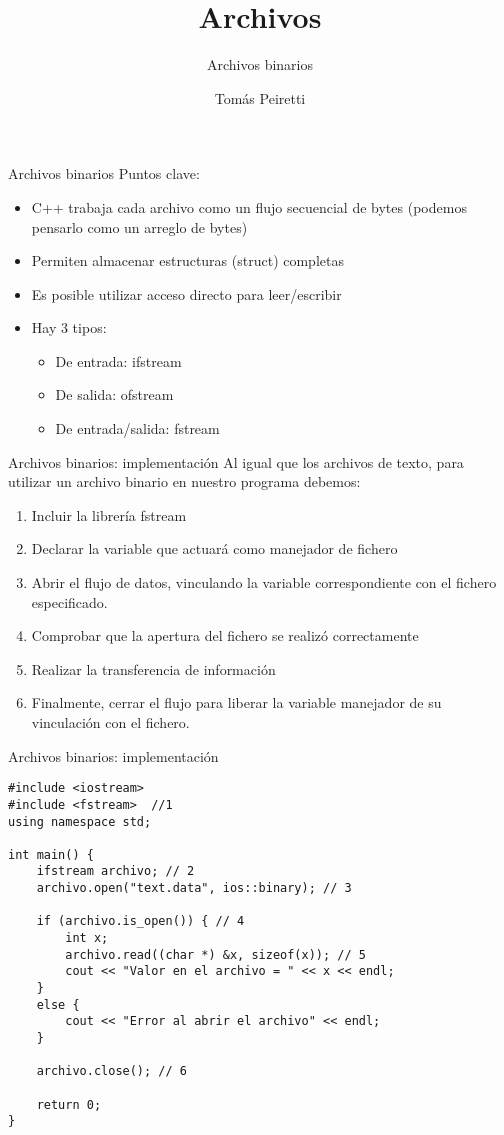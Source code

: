 \documentclass[12pt]{beamer}
\title{Archivos}
\subtitle{Archivos binarios}
\author{Tomás Peiretti}
\date{}
\begin{document}
\maketitle

\begin{frame}{Archivos binarios}
    Puntos clave:
    \begin{itemize}
        \item C++ trabaja cada archivo como un \alert{flujo secuencial de bytes} (podemos pensarlo como un arreglo de bytes)
        \item Permiten almacenar estructuras (struct) completas
        \item Es posible utilizar acceso directo para leer/escribir
        \item Hay 3 tipos:
        \begin{itemize}
            \item De entrada: \alert{ifstream}
            \item De salida: \alert{ofstream}
            \item De entrada/salida: \alert{fstream}
        \end{itemize}
    \end{itemize}
\end{frame}

\begin{frame}{Archivos binarios: implementación}
    Al igual que los archivos de texto, para utilizar un archivo binario en nuestro programa debemos:
        \begin{enumerate}
            \item Incluir la librería fstream
            \item Declarar la variable que actuará como manejador de fichero
            \item Abrir el flujo de datos, vinculando la variable correspondiente con el fichero especificado.
            \item Comprobar que la apertura del fichero se realizó correctamente
            \item \alert{Realizar la transferencia de información}
            \item Finalmente, cerrar el flujo para liberar la variable manejador de su vinculación con el fichero.
        \end{enumerate}
\end{frame}

\begin{frame}[fragile]{Archivos binarios: implementación}
\begin{lstlisting}[basicstyle=\scriptsize]
#include <iostream>
#include <fstream>  //1
using namespace std;

int main() {
	ifstream archivo; // 2
	archivo.open("text.data", ios::binary); // 3
	
	if (archivo.is_open()) { // 4
		int x;
		archivo.read((char *) &x, sizeof(x)); // 5
		cout << "Valor en el archivo = " << x << endl;
	}
	else {
		cout << "Error al abrir el archivo" << endl;
	}
	
	archivo.close(); // 6
	
	return 0;
}
\end{lstlisting}
\end{frame}
\end{document}
